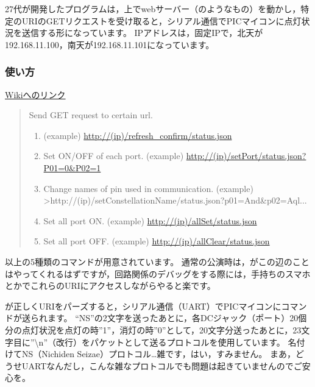 \documentclass[letterpaper,10pt,dvipdfmx]{sphinxmanual}
\begin{document}
27代が開発したプログラムは，上でwebサーバー（のようなもの）を動かし，特定のURIのGETリクエストを受け取ると，シリアル通信でPICマイコンに点灯状況を送信する形になっています。
IPアドレスは，固定IPで，北天が192.168.11.100，南天が192.168.11.101になっています。


\subsubsection{使い方}
\label{\detokenize{wireless/piscium:id6}}
\href{https://github.com/macv35/nichiden27/wiki/Piscium\#usage}{Wikiへのリンク}
\begin{quote}

Send GET request to certain url.
\begin{enumerate}
\item {} 
(example) \url{http://(ip)/refresh\_confirm/status.json}

\item {} 
 Set ON/OFF of each port.
(example) \url{http://(ip)/setPort/status.json?P01=0\&P02=1}

\item {} 
Change names of pin used in communication.
(example)
\textgreater{}http://(ip)/setConstellationName/status.json?p01=And\&p02=Aql...

\item {} 
Set all port ON.
(example) \url{http://(ip)/allSet/status.json}

\item {} 
Set all port OFF.
(example) \url{http://(ip)/allClear/status.json}

\end{enumerate}
\end{quote}

以上の5種類のコマンドが用意されています。
通常の公演時は，がこの辺のことはやってくれるはずですが，回路関係のデバッグをする際には，手持ちのスマホとかでこれらのURIにアクセスしながらやると楽です。

が正しくURIをパーズすると，シリアル通信（UART）でPICマイコンにコマンドが送られます。
``NS''の2文字を送ったあとに，各DCジャック（ポート）20個分の点灯状況を点灯の時''1''，消灯の時''0''として，20文字分送ったあとに，23文字目に''\textbackslash{}n''（改行）をパケットとして送るプロトコルを使用しています。
名付けてNS（Nichiden Seizae）プロトコル…雑です，はい，すみません。
まあ，どうせUARTなんだし，こんな雑なプロトコルでも問題は起きていませんのでご安心を。
\end{document}
